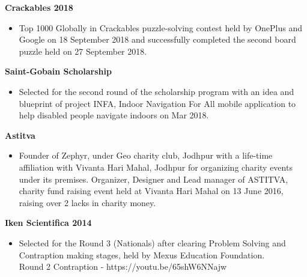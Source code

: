 \documentclass[10pt,a4paper,ragged2e]{altacv}
\begin{document}
\smallskip
\large{\textbf{Crackables 2018}}
\begin{itemize}
\item[\faTrophy] Top 1000 Globally in Crackables puzzle-solving contest held by OnePlus and Google on 18 September 2018 and successfully completed the second board puzzle held on 27 September 2018.
\end{itemize}
\smallskip
\large{\textbf{Saint-Gobain Scholarship}}
\begin{itemize}
\item[\faTrophy] Selected for the second round of the scholarship program with an
idea and blueprint of project INFA, Indoor Navigation For All mobile application to help disabled people
navigate indoors on Mar 2018.
\end{itemize}
\smallskip
\large{\textbf{Astitva}}
\begin{itemize}
\item[\faTrophy] Founder of Zephyr, under Geo charity club, Jodhpur with a life-time affiliation with Vivanta Hari Mahal, Jodhpur for organizing charity events under its premises. Organizer, Designer and Lead manager of ASTITVA, charity fund raising event held at Vivanta Hari Mahal on 13 June 2016, raising over 2 lacks in charity money.
\end{itemize}
\smallskip
\large{\textbf{Iken Scientifica 2014}}
\begin{itemize}
\item[\faTrophy] Selected for the Round 3 (Nationals) after clearing Problem Solving and Contraption making stages, held by Mexus Education Foundation.\\
Round 2 Contraption - https://youtu.be/65shW6NNajw
\end{itemize}
\smallskip



\divider

\divider




\clearpage
\nocite{*}
\end{document}
